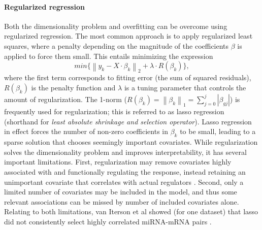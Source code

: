 \paragraph{Regularized regression}
Both the dimensionality problem and overfitting can be overcome using regularized
regression. The most common approach is to apply regularized least squares,
where a penalty depending on the magnitude of the coefficients $\beta$
is applied to force them small. This entails minimizing the expression
\begin{equation}
	min\{ \left \| y_k - X \cdot \beta_k \right \|_2 + \lambda \cdot R(\beta_k) \} ,
\end{equation}
where the first term corresponds to fitting error (the sum of squared residuals),
$R(\beta_k)$ is the penalty function and $\lambda$ is a tuning
parameter that controls the amount of regularization. 
The 1-norm ($R(\beta_k) = \left \| \beta_k \right \|_1 = \sum_{j=0}^{j} \left | \beta_{gj} \right |$)
is frequently used for regularization; this is referred to as lasso regression
(shorthand for \emph{least absolute shrinkage and selection operator}).
Lasso regression in effect forces the number of non-zero coefficients in $\beta_k$
to be small, leading to a sparse solution that chooses seemingly important covariates.
While regularization solves the dimensionality problem and improves
interpretability, it has several important limitations. First, regularization
may remove covariates highly associated with and functionally regulating the
response, instead retaining an unimportant covariate that correlates with
actual regulators \citep{Engelmann2012}. Second, only a limited number of
covariates may be included in the model, and thus some relevant associations
can be missed by number of included covariates alone.%
Relating to both limitations, van Iterson et al showed (for one dataset) that
lasso did not consistently select highly correlated miRNA-mRNA pairs
\citep{vanIterson2013}.

